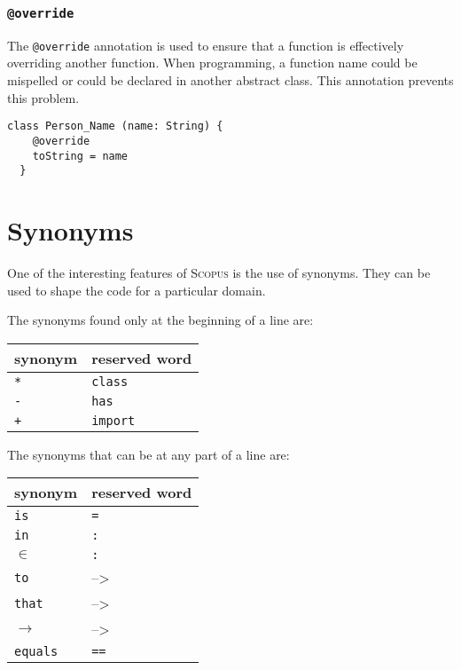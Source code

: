 \documentclass[12pt,a4paper]{article}
\makeatletter
\newcommand{\srccode}[1]{\texttt{{#1}}}
\newcommand{\reservedWord}[1]{{\color{blue}\srccode{#1}}\xspace}
\newcommand{\annotation}[1]{{\color{brown}\srccode{#1}}\xspace}
\newcommand{\sdef}{\srccode{=}}
\newcommand{\scolon}{\srccode{:}}
\newcommand{\sclass}{\reservedWord{class}}
\newcommand{\shas}{\reservedWord{has}}
\newcommand{\simport}{\reservedWord{import}}
\newcommand{\soverride}{\annotation{@override}}
\newcommand{\sequalsSign}{\srccode{==}}
\newcommand{\sasterisk}{\srccode{*}}
\newcommand{\splus}{\srccode{+}}
\newcommand{\sminus}{\srccode{-}}
\newcommand{\sis}{\reservedWord{is}}
\newcommand{\scin}{\reservedWord{in}}
\newcommand{\sto}{\reservedWord{to}}
\newcommand{\sthat}{\reservedWord{that}}
\newcommand{\sequals}{\reservedWord{equals}}
\newcommand{\Scopus}{\textsc{Scopus}\xspace}
\newcommand{\lambdaSymbol}{{\tiny--\textgreater}}
\makeatother
\begin{document}
    \subsubsection{\soverride}

    The \soverride annotation is used to ensure that a function is effectively overriding another function.
    When programming, a function name could be mispelled or could be declared in another abstract class.
    This annotation prevents this problem.

    \begin{lstlisting}[label={lst:exampleOverride}]
  class Person_Name (name: String) {
    @override
    toString = name
  }
    \end{lstlisting}


    \section{Synonyms}

    One of the interesting features of \Scopus is the use of synonyms.
    They can be used to shape the code for a particular domain.

    The synonyms found only at the beginning of a line are:

    \begin{center}
        \begin{tabular}{|ll|}
            \hline
            \textbf{synonym} & \textbf{reserved word} \\
            \hline
            \sasterisk       & \sclass                \\
            \hline
            \sminus          & \shas                  \\
            \hline
            \splus           & \simport               \\
            \hline
        \end{tabular}
    \end{center}

    The synonyms that can be at any part of a line are:

    \begin{center}
        \begin{tabular}{|ll|}
            \hline
            \textbf{synonym} & \textbf{reserved word} \\
            \hline
            \sis             & \sdef                  \\
            \hline
            \scin            & \scolon                \\
            $\in$            & \scolon                \\
            \hline
            \sto             & \lambdaSymbol          \\
            \sthat           & \lambdaSymbol          \\
            $\to$            & \lambdaSymbol          \\
            \hline
            \sequals         & \sequalsSign           \\
            \hline
        \end{tabular}
    \end{center}
\end{document}
